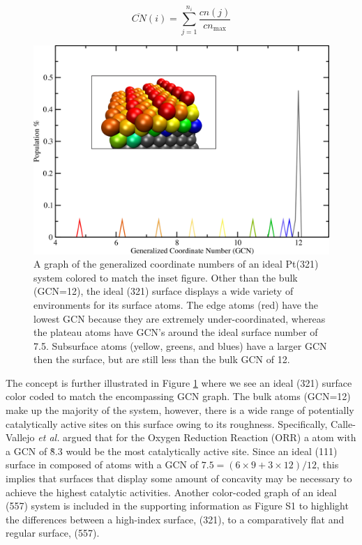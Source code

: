 \begin{equation}
  \overline{CN}(i) = \sum_{j=1}^{n_i}\frac{cn(j)}{cn_{\textrm{max}}}
  \label{eq:gcn}
\end{equation}

\begin{figure}[p!]
  \includegraphics[width=\linewidth]{../figures/chap4/321_ideal_gcn.pdf}
  \caption{A graph of the generalized coordinate numbers of an ideal Pt(321)
system colored to match the inset figure. Other than the bulk (GCN=12), the
ideal (321) surface displays a wide variety of environments for its surface
atoms.  The edge atoms (red) have the lowest GCN because they are extremely
under-coordinated, whereas the plateau atoms have GCN's around the ideal
surface number of 7.5. Subsurface atoms (yellow, greens, and blues) have a
larger GCN then the surface, but are still less than the bulk GCN of 12.  }
\label{fig:ideal321GCN}
\end{figure}

The concept is further illustrated in Figure \ref{fig:ideal321GCN} where we see
an ideal  (321) surface color coded to match the encompassing GCN graph.
The bulk atoms (GCN=12) make up the majority of the system, however, there is a
wide range of potentially catalytically active sites on this surface owing to
its roughness. Specifically, Calle-Vallejo {\em et al.} argued that for the
Oxygen Reduction Reaction (ORR) a  atom with a GCN of \~8.3 would be the
most catalytically active site. Since an ideal (111) surface in composed of
atoms with a GCN of $7.5=(6\times9 + 3\times12)/12$, this implies that surfaces
that display some amount of concavity may be necessary to achieve the highest
catalytic activities. Another color-coded graph of an ideal  (557)
system is included in the supporting information as Figure S1 to highlight the
differences between a high-index surface, (321), to a comparatively flat and
regular surface, (557).

